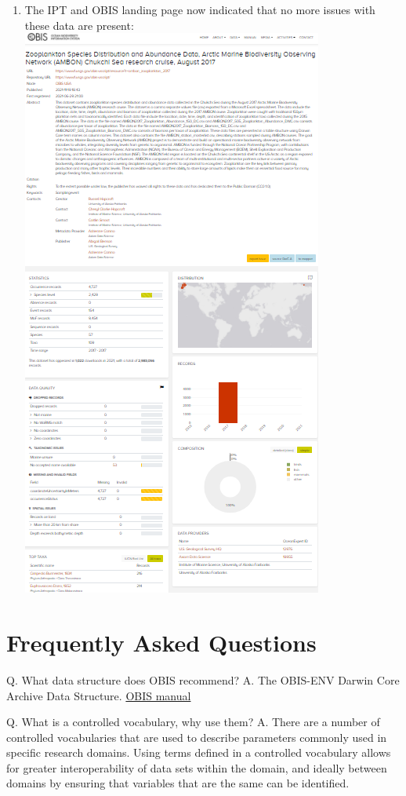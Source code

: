\documentclass[
]{book}
\begin{document}
\begin{enumerate}
\item
  The IPT and OBIS landing page now indicated that no more issues with these data are present:
  \href{https://obis.org/dataset/bc01451e-d990-4ad1-8315-e3fb6e9cf461}{\includegraphics{./figs/obis_dataset.png}}
\end{enumerate}

\hypertarget{frequently-asked-questions}{%
\chapter{Frequently Asked Questions}\label{frequently-asked-questions}}

Q. What data structure does OBIS recommend?
A. The OBIS-ENV Darwin Core Archive Data Structure. \href{https://obis.org/manual/dataformat/\#envdata}{OBIS manual}

Q. What is a controlled vocabulary, why use them?
A. There are a number of controlled vocabularies that are used to describe parameters commonly used in specific research domains. Using terms defined in a controlled vocabulary allows for greater interoperability of data sets within the domain, and ideally between domains by ensuring that variables that are the same can be identified.
\end{document}

